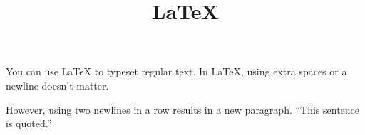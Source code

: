\documentclass[12pt]{article}
\title{\LaTeX}
\date{}
\begin{document}
You can use LaTeX to typeset regular text.  In LaTeX, using
extra     spaces       or      a newline   doesn't matter.

However, using two newlines in a row results in a new
paragraph.
``This sentence is quoted.''

\end{document}
